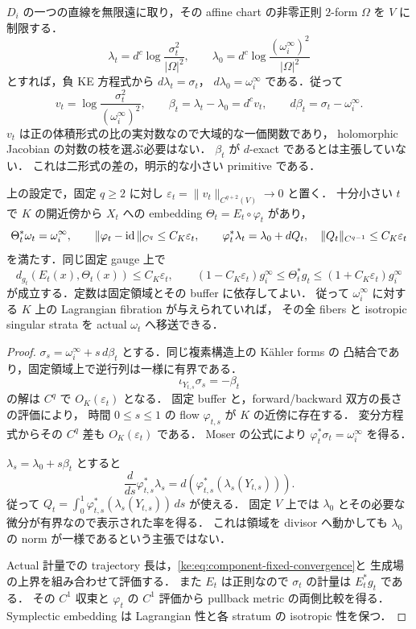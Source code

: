 $D_i$ の一つの直線を無限遠に取り，その affine chart の非零正則 $2$-form
$\Omega$ を $V$ に制限する．
\[
 \lambda_t=d^c\log\frac{\sigma_t^2}{|\Omega|^2},
 \qquad
 \lambda_0=d^c\log\frac{(\omega_i^\infty)^2}{|\Omega|^2}
\]
とすれば，負 KE 方程式から $d\lambda_t=\sigma_t$，
$d\lambda_0=\omega_i^\infty$ である．従って
\begin{equation}\label{ke:eq:component-small-primitive}
 v_t=\log\frac{\sigma_t^2}{(\omega_i^\infty)^2},\qquad
 \beta_t=\lambda_t-\lambda_0=d^cv_t,\qquad
 d\beta_t=\sigma_t-\omega_i^\infty .
\end{equation}
$v_t$ は正の体積形式の比の実対数なので大域的な一価関数であり，
holomorphic Jacobian の対数の枝を選ぶ必要はない．
$\beta_t$ が $d$-exact であるとは主張していない．
これは二形式の差の，明示的な小さい primitive である．

\begin{proposition}
\label{ke:fixed-component-transfer}
上の設定で，固定 $q\ge2$ に対し
$\varepsilon_t=\|v_t\|_{C^{q+2}(V)}\to0$ と置く．
十分小さい $t$ で $K$ の開近傍から $X_t$ への embedding
$\Theta_t=E_t\circ\varphi_t$ があり，
\[
 \Theta_t^*\omega_t=\omega_i^\infty,\qquad
 \|\varphi_t-\operatorname{id}\|_{C^q}\le C_K\varepsilon_t,\qquad
 \varphi_t^*\lambda_t=\lambda_0+dQ_t,\quad
 \|Q_t\|_{C^{q-1}}\le C_K\varepsilon_t
\]
を満たす．同じ固定 gauge 上で
\[
 d_{g_t}(E_t(x),\Theta_t(x))\le C_K\varepsilon_t,\qquad
 (1-C_K\varepsilon_t)g_i^\infty
 \le\Theta_t^*g_t\le
 (1+C_K\varepsilon_t)g_i^\infty
\]
が成立する．定数は固定領域とその buffer に依存してよい．
従って $\omega_i^\infty$ に対する $K$ 上の Lagrangian fibration が与えられていれば，
その全 fibers と isotropic singular strata を actual $\omega_t$ へ移送できる．
\end{proposition}

\begin{proof}
$\sigma_s=\omega_i^\infty+s\,d\beta_t$ とする．同じ複素構造上の K\"ahler forms の
凸結合であり，固定領域上で逆行列は一様に有界である．
\[
 \iota_{Y_{t,s}}\sigma_s=-\beta_t
\]
の解は $C^q$ で $O_K(\varepsilon_t)$ となる．
固定 buffer と，forward/backward 双方の長さの評価により，
時間 $0\le s\le1$ の flow $\varphi_{t,s}$ が $K$ の近傍に存在する．
変分方程式からその $C^q$ 差も $O_K(\varepsilon_t)$ である．
Moser の公式により $\varphi_t^*\sigma_t=\omega_i^\infty$ を得る．

$\lambda_s=\lambda_0+s\beta_t$ とすると
\[
 \frac{d}{ds}\varphi_{t,s}^*\lambda_s
 =d\!\left(\varphi_{t,s}^*(\lambda_s(Y_{t,s}))\right).
\]
従って $Q_t=\int_0^1\varphi_{t,s}^*(\lambda_s(Y_{t,s}))\,ds$ が使える．
固定 $V$ 上では $\lambda_0$ とその必要な微分が有界なので表示された率を得る．
これは領域を divisor へ動かしても $\lambda_0$ の norm が一様であるという主張ではない．

Actual 計量での trajectory 長は，\eqref{ke:eq:component-fixed-convergence}と
生成場の上界を組み合わせて評価する．
また $E_t$ は正則なので $\sigma_t$ の計量は $E_t^*g_t$ である．
その $C^1$ 収束と $\varphi_t$ の $C^1$ 評価から pullback metric の両側比較を得る．
Symplectic embedding は Lagrangian 性と各 stratum の isotropic 性を保つ．
\end{proof}

